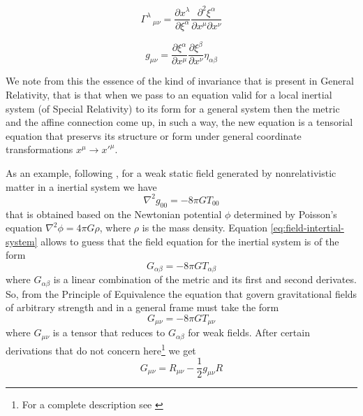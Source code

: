 \documentclass[11pt, letterpaper]{article}
\begin{document}
$$\Gamma^\lambda\,_{\mu\nu} = \frac{\partial x^\lambda}{\partial \xi^\alpha}\frac{\partial^2\xi^\alpha}{\partial x^\mu \partial x^\nu}$$

$$g_{\mu\nu}=\frac{\partial \xi^\alpha}{\partial x^\mu} \frac{\partial \xi^\beta}{\partial x^\nu} \eta_{\alpha\beta}$$

We note from this the essence of the kind of invariance that is present in General Relativity, that is that when we pass to an equation valid for a local inertial system (of Special Relativity) to its form for a general system then the metric and the affine connection come up, in such a way, the new equation is a tensorial equation that preservs its structure or form under general coordinate transformations $x^\mu \to x'^\mu$.

As an example, following \cite{weinberg}, for a weak static field generated by nonrelativistic matter in a inertial system we have
\begin{equation}
	\nabla^2g_{00}=-8\pi GT_{00} \label{eq:field-intertial-system}
\end{equation}
that is obtained based on the Newtonian potential $\phi$ determined by Poisson's equation ${\nabla^2 \phi = 4\pi G \rho}$, where $\rho$ is the mass density. Equation \ref{eq:field-intertial-system} allows to guess that the field equation for the inertial system is of the form
\begin{equation}
	G_{\alpha\beta} = -8\pi GT_{\alpha\beta}
\end{equation}
where $G_{\alpha\beta}$ is a linear combination of the metric and its first and second derivates. So, from the Principle of Equivalence the equation that govern gravitational fields of arbitrary strength and in a general frame must take the form
\begin{equation}
	G_{\mu\nu} = -8\pi GT_{\mu\nu}
\end{equation}
where $G_{\mu\nu}$ is a tensor that reduces to $G_{\alpha\beta}$ for weak fields. After certain derivations that do not concern here\footnote{For a complete description see \cite{weinberg}} we get
\begin{equation}
	G_{\mu\nu} = R_{\mu\nu}-\frac{1}{2}g_{\mu\nu}R \label{eq:Guv}
\end{equation}
\end{document}
